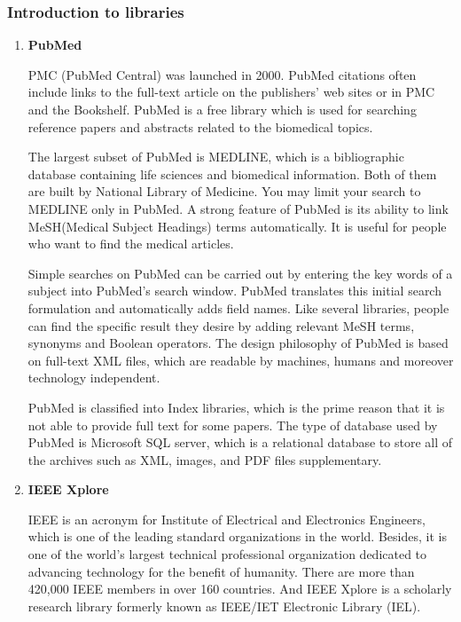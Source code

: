 \subsubsection{Introduction to libraries }

\begin{enumerate}
	
	\item\textbf{PubMed}
	\setlength{\parindent}{1em}
	
	 PMC (PubMed Central) was launched in 2000.
	 PubMed citations often include links to the full-text article on the publishers' web sites or in PMC and the Bookshelf.
	 PubMed is a free library which is used for searching reference papers and abstracts related to the biomedical topics.
	 
	 The largest subset of PubMed is MEDLINE, which is a bibliographic database containing life sciences and biomedical information.
	 Both of them are built by National Library of Medicine. 
	 You may limit your search to MEDLINE only in PubMed.
	 A strong feature of PubMed is its ability to link MeSH(Medical Subject Headings) terms automatically. 
	 It is useful for people who want to find the medical articles.
	  
     Simple searches on PubMed can be carried out by entering the key words of a subject into PubMed's search window.
     PubMed translates this initial search formulation and automatically adds field names.
	 Like several libraries, people can find the specific result they desire by adding relevant MeSH terms, synonyms and Boolean operators.	 
	 The design philosophy of PubMed is based on full-text XML files, which are readable by machines, humans and moreover technology independent.
	 
	 PubMed is classified into Index libraries, which is the prime reason that it is not able to provide full text for some papers.
	 The type of database used by PubMed is Microsoft SQL server, which is a relational database to store all of the archives such as XML, images, and PDF files supplementary.
	
	\item\textbf{IEEE Xplore}
	\setlength{\parindent}{1em}	
	
	IEEE is an acronym for Institute of Electrical and Electronics Engineers, which is one of the leading standard organizations in the world. 
	Besides, it is one of the world's largest technical professional organization dedicated to advancing technology for the benefit of humanity. 
	There are more than 420,000 IEEE members in over 160 countries.
	And IEEE Xplore is a scholarly research library formerly known as IEEE/IET Electronic Library (IEL).
	

\end{enumerate}
